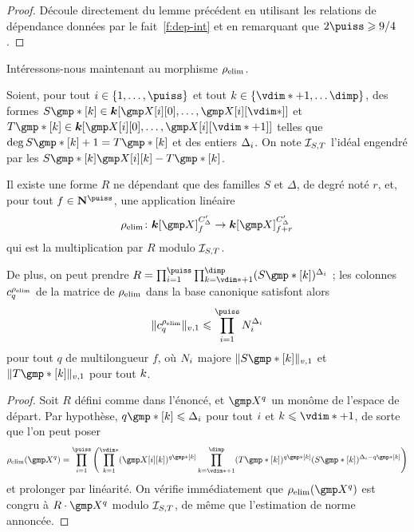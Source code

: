 \begin{proof}
  Découle directement du lemme précédent en utilisant les relations de
  dépendance données par le fait~\ref{f:dep-int} et en remarquant que
  \( 2\puiss \ge 9/4 \).
\end{proof}

Intéressons-nous maintenant au morphisme \( \rho_{\mathrm{elim}} \).

\begin{lem}
  Soient, pour tout \( \fct \in \{ 1, \dots, \puiss \} \) et tout \( \ind \in
  \{ \vdim* + 1, \dots \dimp \} \), des formes
  \( S\mexp*[\ind] \in \cdn [ \cmh\fct[0], \dots, \cmh\fct[\vdim*] ] \) et
  \( T\mexp*[\ind] \in \cdn [ \cmh\fct[0], \dots, \cmh\fct[\vdim*+1] ] \)
  telles que \( \deg S\mexp*[\ind] + 1 = T\mexp*[\ind] \) et des entiers
  \( \Delta_i \). On note \( \mathcal I_{S, T} \) l'idéal engendré par les
  \( S\mexp*[\ind] \cmh\fct[\ind] - T\mexp*[\ind] \).

  Il existe une forme \( R \) ne dépendant que des familles \( S \) et \(
  \Delta \), de degré noté \( r \), et, pour tout \( f \in \N^\puiss \), une
  application linéaire
  \begin{equation}
    \relim \colon
    \cdn [\cmmh]_ {f}^{C'_\Delta}
    \to
    \cdn [\cmmh]_ {f+r}^{C'_\Delta}
  \end{equation}
  qui est la multiplication par \( R \) modulo \( \mathcal I_{S, T} \).

  De plus, on peut prendre
  \( R = \prod\fctrange \prod_{\ind = \vdim*+1}^{\dimp}
    ( S\mexp*[\ind] )^{\Delta_\fct} \) ; les colonnes \( c_q^{\rho_{\mathrm{elim}}} \) de la
  matrice de \( \rho_{\mathrm{elim}} \) dans la base canonique satisfont alors
  \begin{equation}
    \nv1{ c_q^{\relim} }
    \le
    \prod\fctrange N_\fct^{\Delta_\fct}
  \end{equation}
  pour tout \( q \) de multilongueur \( f \), où \( N_i \) majore
  \( \nv1{ S\mexp*[\ind] } \) et \( \nv1{ T\mexp*[\ind] } \) pour tout
  \( k \).
\end{lem}

\begin{proof}
  Soit \( R \) défini comme dans l'énoncé, et \( \cmmh^q \) un monôme de
  l'espace de départ. Par hypothèse, \( q\mexp*[\ind] \le \Delta_\fct \) pour
  tout \( i \) et \( \ind \le \vdim* + 1 \), de sorte que l'on peut poser
  \begin{equation}
    \relim( \cmmh^q )
    =
    \prod\fctrange \left(
    \prod_{\ind=1}^{\vdim*}
    (\cmh\fct[\ind])^{q\mexp*[\ind]}
    \prod_{\ind=\vdim*+1}^\dimp
    (T\mexp*[\ind])^{q\mexp*[\ind]}
    (S\mexp*[\ind])^{\Delta_\fct - q\mexp*[\ind]}
    \right)
  \end{equation}
  et prolonger par linéarité. On vérifie immédiatement que \( \relim(\cmmh^q)
  \) est congru à \( R \cdot \cmmh^q \) modulo \( \mathcal I_{S, T} \), de même
  que l'estimation de norme annoncée.
\end{proof}

